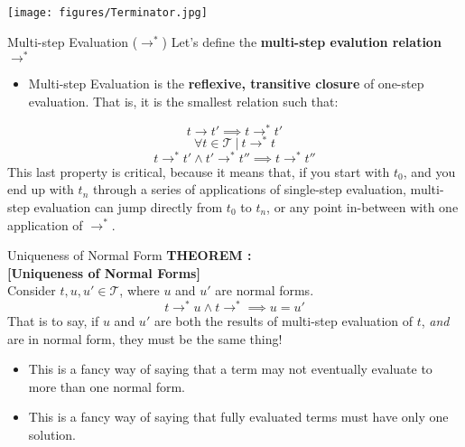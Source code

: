 \documentclass[11pt]{beamer}
\begin{document}
\begin{frame}[fragile=singleslide]{}
\begin{center}
\texttt{[image: figures/Terminator.jpg]}
\end{center}
\end{frame}

\begin{frame}[fragile=singleslide]{Multi-step Evaluation ($\rightarrow^*$)}
Let's define the \textbf{multi-step evalution relation} $\rightarrow^*$
\begin{itemize}
\item Multi-step Evaluation is the \textbf{reflexive, transitive closure} of one-step evaluation.  That is, it is the smallest relation such that:
\end{itemize}
\begin{equation}
t \rightarrow t' \implies t \rightarrow^* t'
\end{equation}
\begin{equation}
\forall t \in \mathcal{T} \:|\: t \rightarrow^* t
\end{equation}
\begin{equation}
t \rightarrow^* t' \land t' \rightarrow^* t'' \implies t \rightarrow^* t''
\end{equation}
This last property is critical, because it means that, if you start with $t_0$, and you end up with $t_n$ through a series of applications of single-step evaluation, multi-step evaluation can jump directly from $t_0$ to $t_n$, or any point in-between with one application of $\rightarrow^*$.
\end{frame}

\begin{frame}[fragile=singleslide]{Uniqueness of Normal Form}
\textbf{THEOREM :} \\
\textbf{[Uniqueness of Normal Forms]}  \\
Consider $t, u, u' \in \mathcal{T}$, where $u$ and $u'$ are normal forms.
\begin{equation}
t \rightarrow^* u \land t \rightarrow^* \implies u = u' 
\end{equation}
That is to say, if $u$ and $u'$ are both the results of multi-step evaluation of $t$, \emph{and} are in normal form, they must be the same thing!
\begin{itemize}
\item This is a fancy way of saying that a term may not eventually evaluate to more than one normal form.  
\item This is a fancy way of saying that fully evaluated terms must have only one solution.  
\end{itemize}
\end{frame}
\end{document}
